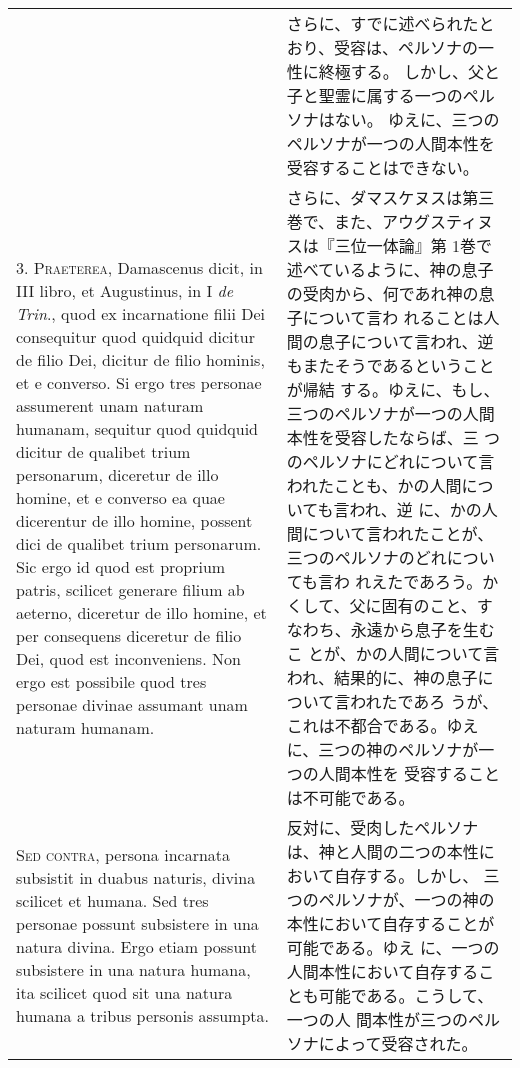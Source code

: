 \documentclass[10pt]{jsarticle} %
\begin{document}
\begin{longtable}{p{21em}p{21em}}
&

さらに、すでに述べられたとおり、受容は、ペルソナの一性に終極する。
しかし、父と子と聖霊に属する一つのペルソナはない。
ゆえに、三つのペルソナが一つの人間本性を受容することはできない。

\\



3. {\scshape Praeterea}, Damascenus dicit, in III libro, et Augustinus, in I {\itshape
 de Trin}.,
quod ex incarnatione filii Dei consequitur quod quidquid dicitur de
filio Dei, dicitur de filio hominis, et e converso. Si ergo tres
personae assumerent unam naturam humanam, sequitur quod quidquid dicitur
de qualibet trium personarum, diceretur de illo homine, et e converso ea
quae dicerentur de illo homine, possent dici de qualibet trium
personarum. Sic ergo id quod est proprium patris, scilicet generare
filium ab aeterno, diceretur de illo homine, et per consequens diceretur
de filio Dei, quod est inconveniens. Non ergo est possibile quod tres
personae divinae assumant unam naturam humanam.


&

さらに、ダマスケヌスは第三巻で、また、アウグスティヌスは『三位一体論』第
 1巻で述べているように、神の息子の受肉から、何であれ神の息子について言わ
 れることは人間の息子について言われ、逆もまたそうであるということが帰結
 する。ゆえに、もし、三つのペルソナが一つの人間本性を受容したならば、三
 つのペルソナにどれについて言われたことも、かの人間についても言われ、逆
 に、かの人間について言われたことが、三つのペルソナのどれについても言わ
 れえたであろう。かくして、父に固有のこと、すなわち、永遠から息子を生むこ
 とが、かの人間について言われ、結果的に、神の息子について言われたであろ
 うが、これは不都合である。ゆえに、三つの神のペルソナが一つの人間本性を
 受容することは不可能である。


\\



{\scshape Sed contra}, persona incarnata subsistit in duabus naturis, divina
scilicet et humana. Sed tres personae possunt subsistere in una natura
divina. Ergo etiam possunt subsistere in una natura humana, ita scilicet
quod sit una natura humana a tribus personis assumpta.


&

反対に、受肉したペルソナは、神と人間の二つの本性において自存する。しかし、
 三つのペルソナが、一つの神の本性において自存することが可能である。ゆえ
 に、一つの人間本性において自存することも可能である。こうして、一つの人
 間本性が三つのペルソナによって受容された。


\end{longtable}
\end{document}
